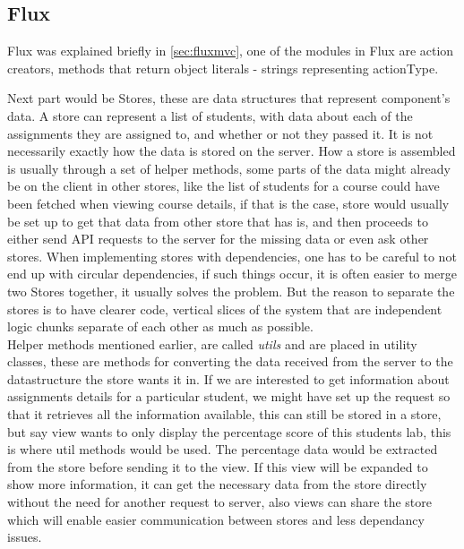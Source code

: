 \subsection{Flux}
Flux was explained briefly in \ref{sec:fluxmvc}, one of the modules in Flux are action creators, methods that return object literals - strings representing actionType.

Next part would be Stores, these are data structures that represent component's data. A store can represent a list of students, with data about each of the assignments they are assigned to, and whether or not they passed it. It is not necessarily exactly how the data is stored on the server. How a store is assembled is usually through a set of helper methods, some parts of the data might already be on the client in other stores, like the list of students for a course could have been fetched when viewing course details, if that is the case, store would usually be set up to get that data from other store that has is, and then proceeds to either send API requests to the server for the missing data or even ask other stores. When implementing stores with dependencies, one has to be careful to not end up with circular dependencies, if such things occur, it is often easier to merge two Stores together, it usually solves the problem. But the reason to separate the stores is to have clearer code, vertical slices of the system that are independent logic chunks separate of each other as much as possible.
\\Helper methods mentioned earlier, are called \emph{utils} and are placed in utility classes, these are methods for converting the data received from the server to the datastructure the store wants it in. If we are interested to get information about assignments details for a particular student, we might have set up the request so that it retrieves all the information available, this can still be stored in a store, but say view wants to only display the percentage score of this students lab, this is where util methods would be used. The percentage data would be extracted from the store before sending it to the view. If this view will be expanded to show more information, it can get the necessary data from the store directly without the need for another request to server, also views can share the store which will enable easier communication between stores and less dependancy issues.
